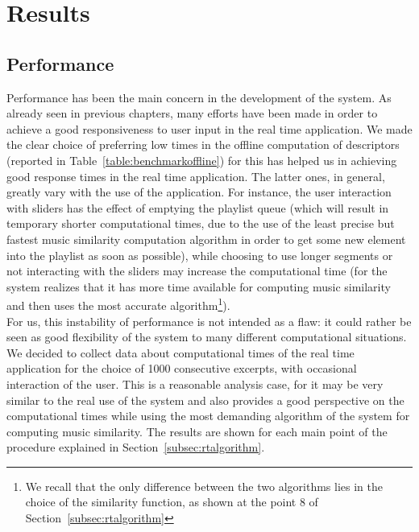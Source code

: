 \chapter{Results} 

\label{Chapter7} 


\section{Performance}
Performance has been the main concern in the development of the system. As already seen in previous chapters, many efforts have been made in order to achieve a good responsiveness to user input in the real time application. We made the clear choice of preferring low times in the offline computation of descriptors (reported in Table~\ref{table:benchmarkoffline}) for this has helped us in achieving good response times in the real time application. The latter ones, in general, greatly vary with the use of the application. For instance, the user interaction with sliders has the effect of emptying the playlist queue (which will result in temporary shorter computational times, due to the use of the least precise but fastest music similarity computation algorithm in order to get some new element into the playlist as soon as possible), while choosing to use longer segments or not interacting with the sliders may increase the computational time (for the system realizes that it has more time available for computing music similarity and then uses the most accurate algorithm\footnote{We recall that the only difference between the two algorithms lies in the choice of the similarity function, as shown at the point 8 of Section~\ref{subsec:rtalgorithm}}). \\
For us, this instability of performance is not intended as a flaw: it could rather be seen as good flexibility of the system to many different computational situations.\\
We decided to collect data about computational times of the real time application for the choice of 1000 consecutive excerpts, with occasional interaction of the user. This is a reasonable analysis case, for it may be very similar to the real use of the system and also provides a good perspective on the computational times while using the most demanding algorithm of the system for computing music similarity. The results are shown for each main point of the procedure explained in Section~\ref{subsec:rtalgorithm}.



